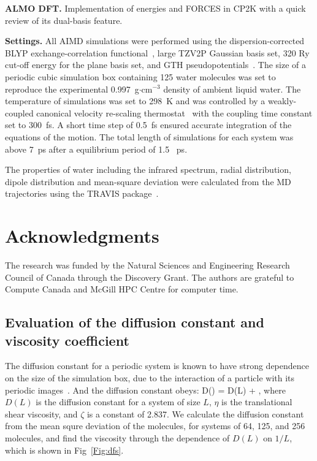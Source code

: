 \documentclass[aps,prl,reprint,amsmath,amssymb]{revtex4-1}
\begin{document}
\textbf{ALMO DFT.} Implementation of energies and FORCES in CP2K with a quick review of its dual-basis feature.

\textbf{Settings.} All AIMD simulations were performed using the dispersion-corrected~\cite{grimme2010consistent} BLYP exchange-correlation functional~\cite{becke1988density}, large TZV2P Gaussian basis set, 320 Ry cut-off energy for the plane basis set, and GTH pseudopotentials~\cite{goedecker1996separable,krack2005pseudopotentials}. 
The size of a periodic cubic simulation box containing 125 water molecules was set to reproduce the experimental 0.997~g$\cdot$cm$^{-3}$ density of ambient liquid water. 
The temperature of simulations was set to 298~K and was controlled by a weakly-coupled canonical velocity re-scaling thermostat~\cite{bussi2007canonical} with the coupling time constant set to 300~fs. 
A short time step of 0.5~fs ensured accurate integration of the equations of the motion. 
The total length of simulations for each system was above 7~ps after a equilibrium period of 1.5 ~ps.

The properties of water including the infrared spectrum, radial distribution, dipole distribution and mean-square deviation were calculated from the MD trajectories using the TRAVIS package~\cite{brehm2012travis}.  

\section{Acknowledgments} 

The research was funded by the Natural Sciences and Engineering Research Council of Canada through the Discovery Grant. 
The authors are grateful to Compute Canada and McGill HPC Centre for computer time.



\else %

\subsection{Evaluation of the diffusion constant and viscosity coefficient} 

The diffusion constant for a periodic system is known to have strong dependence on the size of the simulation box, due to the interaction of a particle with its periodic images~\cite{dunweg1993molecular}. 
And the diffusion constant obeys:
%
\bea
D(\infty) = D(L) + ,
\eea
%
where $D(L)$ is the diffusion constant for a system of size $L$, $\eta$ is the translational shear viscosity, and $\zeta$ is a constant of 2.837. 
We calculate the diffusion constant from the mean squre deviation of the molecules, for systems of 64, 125, and 256 molecules, and find the viscosity through the dependence of $D(L)$ on $1/L$, which is shown in Fig~\ref{Fig:dfs}.
\end{document}
